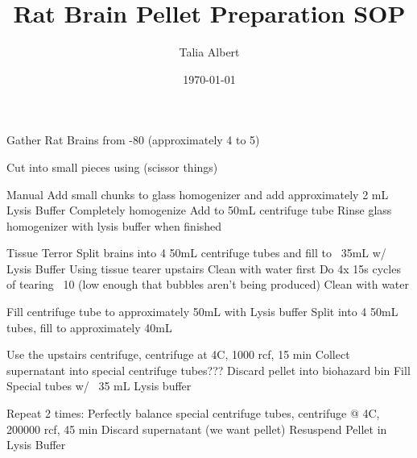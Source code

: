 \documentclass[12pt, letterpaper]{article}
\title{Rat Brain Pellet Preparation SOP}
\author{
    Talia Albert
}
\date{\today}
\begin{document}
\maketitle
\tableofcontents

Gather Rat Brains from -80 (approximately 4 to 5)

Cut into small pieces using (scissor things)

Manual
    Add small chunks to glass homogenizer and add approximately 2 mL Lysis Buffer
    Completely homogenize
    Add to 50mL centrifuge tube
    Rinse glass homogenizer with lysis buffer when finished

Tissue Terror
    Split brains into 4 50mL centrifuge tubes and fill to ~35mL w/ Lysis Buffer
    Using tissue tearer upstairs
        Clean with water first
        Do 4x 15s cycles of tearing ~10 (low enough that bubbles aren't being produced)
        Clean with water

Fill centrifuge tube to approximately 50mL with Lysis buffer
    Split into 4 50mL tubes, fill to approximately 40mL

Use the upstairs centrifuge, centrifuge at 4C, 1000 rcf, 15 min
    Collect supernatant into special centrifuge tubes??? 
    Discard pellet into biohazard bin
    Fill Special tubes w/ ~35 mL Lysis buffer

Repeat 2 times:
    Perfectly balance special centrifuge tubes, centrifuge @ 4C, 200000 rcf, 45 min
        Discard supernatant (we want pellet)
        Resuspend Pellet in Lysis Buffer
\end{document}
